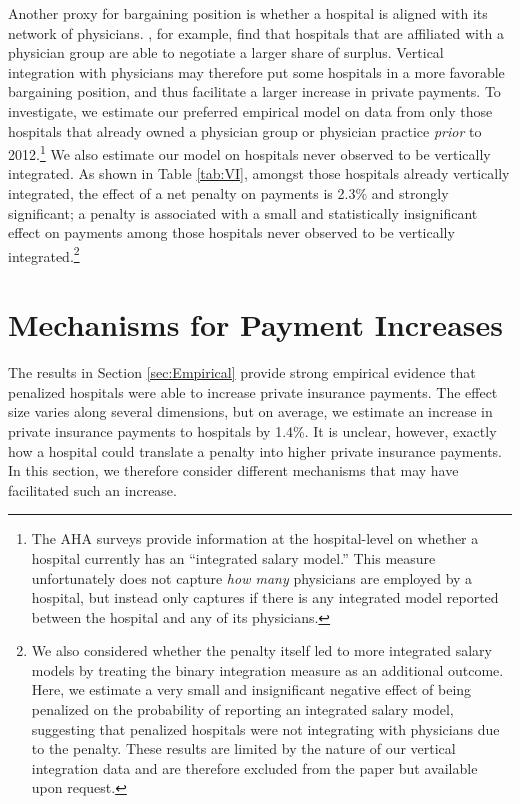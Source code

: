 \documentclass[12pt]{article}
\begin{document}
Another proxy for bargaining position is whether a hospital is aligned with its network of physicians. \cite{lewis2015}, for example, find that hospitals that are affiliated with a physician group are able to negotiate a larger share of surplus. Vertical integration with physicians may therefore put some hospitals in a more favorable bargaining position, and thus facilitate a larger increase in private payments. To investigate, we estimate our preferred empirical model on data from only those hospitals that already owned a physician group or physician practice \textit{prior} to 2012.\footnote{The AHA surveys provide information at the hospital-level on whether a hospital currently has an ``integrated salary model.'' This measure unfortunately does not capture \textit{how many} physicians are employed by a hospital, but instead only captures if there is any integrated model reported between the hospital and any of its physicians.} We also estimate our model on hospitals never observed to be vertically integrated.  As shown in Table \ref{tab:VI}, amongst those hospitals already vertically integrated, the effect of a net penalty on payments is 2.3$\%$ and strongly significant; a penalty is associated with a small and statistically insignificant effect on payments among those hospitals never observed to be vertically integrated.\footnote{We also considered whether the penalty itself led to more integrated salary models by treating the binary integration measure as an additional outcome. Here, we estimate a very small and insignificant negative effect of being penalized on the probability of reporting an integrated salary model, suggesting that penalized hospitals were not integrating with physicians due to the penalty. These results are limited by the nature of our vertical integration data and are therefore excluded from the paper but available upon request.}


\section{Mechanisms for Payment Increases}
\label{sec:alt}
The results in Section \ref{sec:Empirical} provide strong empirical evidence that penalized hospitals were able to increase private insurance payments. The effect size varies along several dimensions, but on average, we estimate an increase in private insurance payments to hospitals by 1.4\%. It is unclear, however, exactly how a hospital could translate a penalty into higher private insurance payments. In this section, we therefore consider different mechanisms that may have facilitated such an increase.
\end{document}
